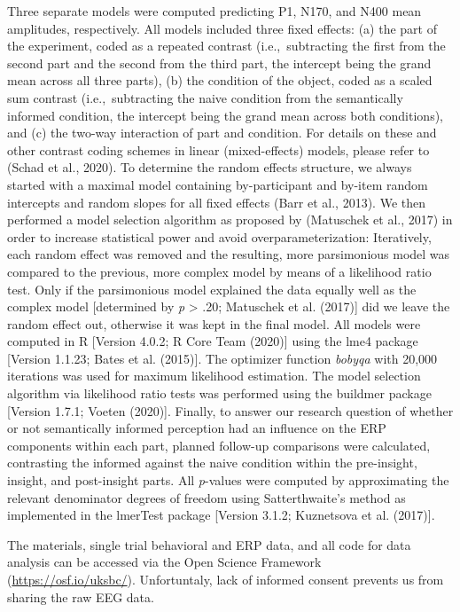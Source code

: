 \documentclass[
  english,
  doc,12pt,twoside,floatsintext]{apa7}
\begin{document}
Three separate models were computed predicting P1, N170, and N400 mean amplitudes, respectively. All models included three fixed effects: (a) the part of the experiment, coded as a repeated contrast (i.e.,~subtracting the first from the second part and the second from the third part, the intercept being the grand mean across all three parts), (b) the condition of the object, coded as a scaled sum contrast (i.e.,~subtracting the naive condition from the semantically informed condition, the intercept being the grand mean across both conditions), and (c) the two-way interaction of part and condition. For details on these and other contrast coding schemes in linear (mixed-effects) models, please refer to (Schad et al., 2020). To determine the random effects structure, we always started with a maximal model containing by-participant and by-item random intercepts and random slopes for all fixed effects (Barr et al., 2013). We then performed a model selection algorithm as proposed by (Matuschek et al., 2017) in order to increase statistical power and avoid overparameterization: Iteratively, each random effect was removed and the resulting, more parsimonious model was compared to the previous, more complex model by means of a likelihood ratio test. Only if the parsimonious model explained the data equally well as the complex model {[}determined by \emph{p} \textgreater{} .20; Matuschek et al. (2017){]} did we leave the random effect out, otherwise it was kept in the final model. All models were computed in R {[}Version 4.0.2; R Core Team (2020){]} using the lme4 package {[}Version 1.1.23; Bates et al. (2015){]}. The optimizer function \emph{bobyqa} with 20,000 iterations was used for maximum likelihood estimation. The model selection algorithm via likelihood ratio tests was performed using the buildmer package {[}Version 1.7.1; Voeten (2020){]}. Finally, to answer our research question of whether or not semantically informed perception had an influence on the ERP components within each part, planned follow-up comparisons were calculated, contrasting the informed against the naive condition within the pre-insight, insight, and post-insight parts. All \emph{p}-values were computed by approximating the relevant denominator degrees of freedom using Satterthwaite's method as implemented in the lmerTest package {[}Version 3.1.2; Kuznetsova et al. (2017){]}.

The materials, single trial behavioral and ERP data, and all code for data analysis can be accessed via the Open Science Framework (\url{https://osf.io/uksbc/}). Unfortuntaly, lack of informed consent prevents us from sharing the raw EEG data.
\end{document}
